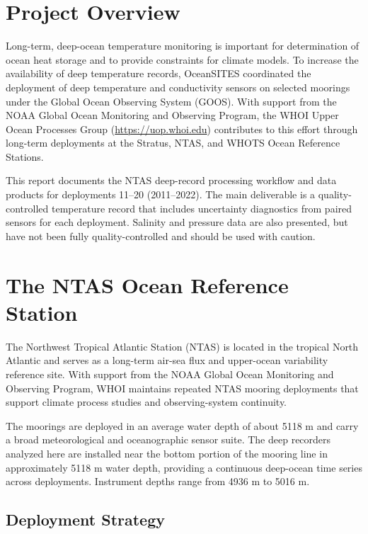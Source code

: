 
\section{Project Overview}

Long-term, deep-ocean temperature monitoring is important for determination of ocean heat storage and to provide constraints for climate models. To increase the availability of deep temperature records, OceanSITES coordinated the deployment of deep temperature and conductivity sensors on selected moorings under the Global Ocean Observing System (GOOS). With support from the NOAA Global Ocean Monitoring and Observing Program, the WHOI Upper Ocean Processes Group (\url{https://uop.whoi.edu}) contributes to this effort through long-term deployments at the Stratus, NTAS, and WHOTS Ocean Reference Stations.

This report documents the NTAS deep-record processing workflow and data products for deployments 11--20 (2011--2022). The main deliverable is a quality-controlled temperature record that includes uncertainty diagnostics from paired sensors for each deployment. Salinity and pressure data are also presented, but have not been fully quality-controlled and should be used with caution.

\section{The NTAS Ocean Reference Station}

The Northwest Tropical Atlantic Station (NTAS) is located in the tropical North Atlantic and serves as a long-term air-sea flux and upper-ocean variability reference site. With support from the NOAA Global Ocean Monitoring and Observing Program, WHOI maintains repeated NTAS mooring deployments that support climate process studies and observing-system continuity.

The moorings are deployed in an average water depth of about 5118 m and carry a broad meteorological and oceanographic sensor suite. The deep recorders analyzed here are installed near the bottom portion of the mooring line in approximately 5118 m water depth, providing a continuous deep-ocean time series across deployments. Instrument depths range from 4936 m to 5016 m.

\subsection{Deployment Strategy}

